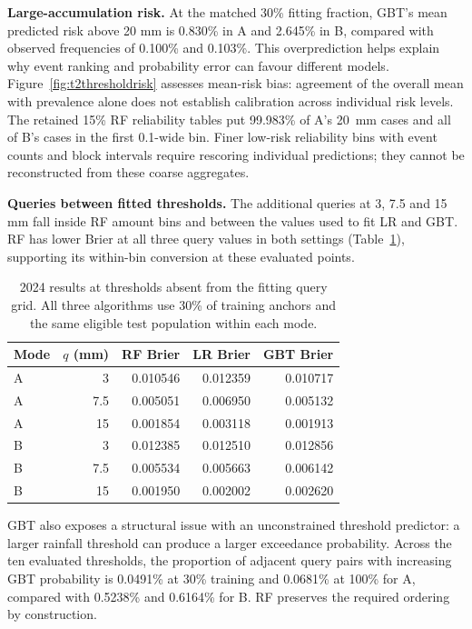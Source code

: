 \textbf{Large-accumulation risk.} At the matched 30\% fitting fraction, GBT's mean predicted risk above 20 mm is 0.830\% in A and 2.645\% in B, compared with observed frequencies of 0.100\% and 0.103\%. This overprediction helps explain why event ranking and probability error can favour different models. Figure~\ref{fig:t2thresholdrisk} assesses mean-risk bias: agreement of the overall mean with prevalence alone does not establish calibration across individual risk levels. The retained 15\% RF reliability tables put 99.983\% of A's 20~mm cases and all of B's cases in the first 0.1-wide bin. Finer low-risk reliability bins with event counts and block intervals require rescoring individual predictions; they cannot be reconstructed from these coarse aggregates.

\textbf{Queries between fitted thresholds.} The additional queries at 3, 7.5 and 15 mm fall inside RF amount bins and between the values used to fit LR and GBT. RF has lower Brier at all three query values in both settings (Table~\ref{tab:interior}), supporting its within-bin conversion at these evaluated points.
\begin{table}[!ht]\centering\small
\begin{tabular}{lrrrr}\toprule
Mode & $q$ (mm) & RF Brier & LR Brier & GBT Brier\\\midrule
A & 3 & 0.010546 & 0.012359 & 0.010717 \\
A & 7.5 & 0.005051 & 0.006950 & 0.005132 \\
A & 15 & 0.001854 & 0.003118 & 0.001913 \\
B & 3 & 0.012385 & 0.012510 & 0.012856 \\
B & 7.5 & 0.005534 & 0.005663 & 0.006142 \\
B & 15 & 0.001950 & 0.002002 & 0.002620 \\
\bottomrule\end{tabular}
\caption{2024 results at thresholds absent from the fitting query grid. All three algorithms use 30\% of training anchors and the same eligible test population within each mode.}\label{tab:interior}
\end{table}
\FloatBarrier
GBT also exposes a structural issue with an unconstrained threshold predictor: a larger rainfall threshold can produce a larger exceedance probability. Across the ten evaluated thresholds, the proportion of adjacent query pairs with increasing GBT probability is 0.0491\% at 30\% training and 0.0681\% at 100\% for A, compared with 0.5238\% and 0.6164\% for B. RF preserves the required ordering by construction.


